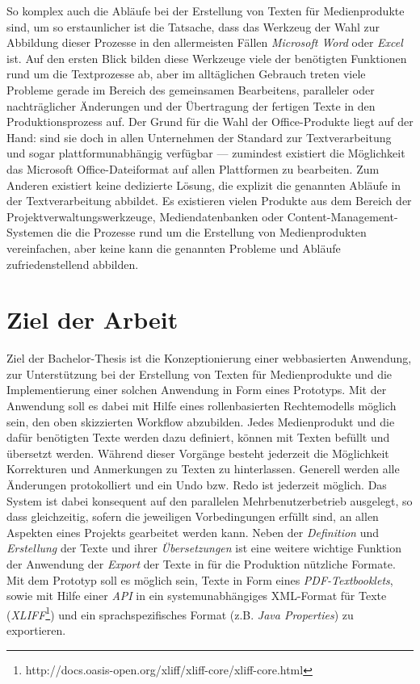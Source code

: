 \documentclass[11pt,a4paper]{article}
\begin{document}
So komplex auch die Abläufe bei der Erstellung von Texten für Medienprodukte sind, um so erstaunlicher ist die Tatsache, dass das Werkzeug der Wahl zur Abbildung dieser Prozesse in den allermeisten Fällen \emph{Microsoft Word} oder \emph{Excel} ist. Auf den ersten Blick bilden diese Werkzeuge viele der benötigten Funktionen rund um die Textprozesse ab, aber im alltäglichen Gebrauch treten viele Probleme gerade im Bereich des gemeinsamen Bearbeitens, paralleler oder nachträglicher Änderungen und der Übertragung der fertigen Texte in den Produktionsprozess auf. Der Grund für die Wahl der Office-Produkte liegt auf der Hand: sind sie doch in allen Unternehmen der Standard zur Textverarbeitung und sogar plattformunabhängig verfügbar --- zumindest existiert die Möglichkeit das Microsoft Office-Dateiformat auf allen Plattformen zu bearbeiten. Zum Anderen existiert keine dedizierte Lösung, die explizit die genannten Abläufe in der Textverarbeitung abbildet. Es existieren vielen Produkte aus dem Bereich der Projektverwaltungswerkzeuge, Mediendatenbanken oder Content-Management-Systemen die die Prozesse rund um die Erstellung von Medienprodukten vereinfachen, aber keine kann die genannten Probleme und Abläufe zufriedenstellend abbilden.

\section*{Ziel der Arbeit}

Ziel der Bachelor-Thesis ist die Konzeptionierung einer webbasierten Anwendung, zur Unterstützung bei der Erstellung von Texten für Medienprodukte und die Implementierung einer solchen Anwendung in Form eines Prototyps. Mit der Anwendung soll es dabei mit Hilfe eines rollenbasierten Rechtemodells möglich sein, den oben skizzierten Workflow abzubilden. Jedes Medienprodukt und die dafür benötigten Texte werden dazu definiert, können mit Texten befüllt und übersetzt werden. Während dieser Vorgänge besteht jederzeit die Möglichkeit Korrekturen und Anmerkungen zu Texten zu hinterlassen. Generell werden alle Änderungen protokolliert und ein Undo bzw. Redo ist jederzeit möglich. Das System ist dabei konsequent auf den parallelen Mehrbenutzerbetrieb ausgelegt, so dass gleichzeitig, sofern die jeweiligen Vorbedingungen erfüllt sind, an allen Aspekten eines Projekts gearbeitet werden kann. Neben der \emph{Definition} und \emph{Erstellung} der Texte und ihrer \emph{Übersetzungen} ist eine weitere wichtige Funktion der Anwendung der \emph{Export} der Texte in für die Produktion nützliche Formate. Mit dem Prototyp soll es möglich sein, Texte in Form eines \emph{PDF-Textbooklets}, sowie mit Hilfe einer \emph{API} in ein systemunabhängiges XML-Format für Texte (\emph{XLIFF}\footnote{http://docs.oasis-open.org/xliff/xliff-core/xliff-core.html}) und ein sprachspezifisches Format (z.B. \emph{Java Properties}) zu exportieren. 
\end{document}

